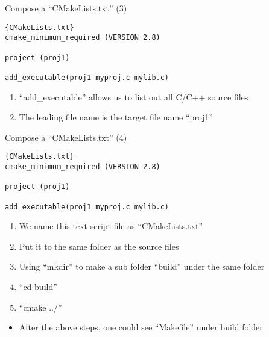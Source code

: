 \begin{frame}[fragile]{Compose a ``CMakeLists.txt'' (3)}
\begin{lstlisting}[linewidth=0.95\linewidth, firstnumber= 1, xleftmargin=0.02\linewidth]{CMakeLists.txt}
cmake_minimum_required (VERSION 2.8)

project (proj1)

add_executable(proj1 myproj.c mylib.c)
\end{lstlisting}

\begin{enumerate}
	\item {``add\_executable'' allows us to list out all C/C++ source files}
	\vspace{0.15in}
	\item {The leading file name is the target file name ``proj1''}
\end{enumerate}
\end{frame}

\begin{frame}[fragile]{Compose a ``CMakeLists.txt'' (4)}
\begin{lstlisting}[linewidth=0.95\linewidth, firstnumber= 1, xleftmargin=0.02\linewidth]{CMakeLists.txt}
cmake_minimum_required (VERSION 2.8)

project (proj1)

add_executable(proj1 myproj.c mylib.c)
\end{lstlisting}

\begin{enumerate}
	\item {We name this text script file as ``CMakeLists.txt''}
	\vspace{0.1in}
	\item {Put it to the same folder as the source files}
	\vspace{0.1in}
	\item {Using ``mkdir'' to make a sub folder ``build'' under the same folder}
	\vspace{0.10in}
	\item {``cd build''}
	\vspace{0.10in}
	\item {``cmake ../''}
\end{enumerate}
\begin{itemize}
	\item {After the above steps, one could see ``Makefile'' under build folder}
\end{itemize}
\end{frame}


